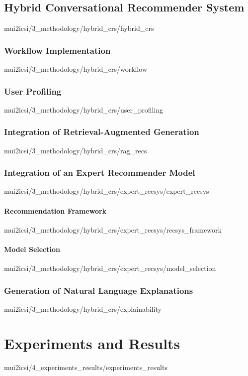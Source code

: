 \documentclass[english,epsbased,copyright,final,printable,covers,extendedindex,firstnumbered,tfm,gnuplot,loc,loe,lof,lot]{tfgtfmthesisuam}
\begin{document}
    \section{Hybrid Conversational Recommender System\label{SEC:HYBRIDCRS}}{mui2icsi/3_methodology/hybrid_crs/hybrid_crs}
      \subsection{Workflow Implementation\label{SS:IMPLEM}}{mui2icsi/3_methodology/hybrid_crs/workflow}
      \subsection{User Profiling\label{SS:USERPROF}}{mui2icsi/3_methodology/hybrid_crs/user_profiling}
      \subsection{Integration of Retrieval-Augmented Generation\label{SS:INTEGRAGRECS}}{mui2icsi/3_methodology/hybrid_crs/rag_recs}
      \subsection{Integration of an Expert Recommender Model\label{SS:INTEGEXPERTRECSYS}}{mui2icsi/3_methodology/hybrid_crs/expert_recsys/expert_recsys}
        \subsubsection{Recommendation Framework\label{SSS:RECFRAMEWORK}}{mui2icsi/3_methodology/hybrid_crs/expert_recsys/recsys_framework}
        \subsubsection{Model Selection\label{SSS:MODELSELECT}}{mui2icsi/3_methodology/hybrid_crs/expert_recsys/model_selection}
      \subsection{Generation of Natural Language Explanations\label{SS:GENEXPLAIN}}{mui2icsi/3_methodology/hybrid_crs/explainability}

  \chapter{Experiments and Results\label{CAP:EXPRES}}{mui2icsi/4_experiments_results/experiments_results}
\end{document}
